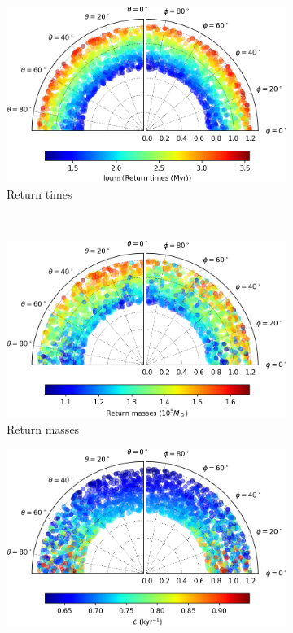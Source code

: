 \begin{figure}[h]
    \centering
    \begin{subfigure}[t]{0.4\textwidth}
        \includegraphics[width = \textwidth]{"../Files/Week 13/images/11_time"}
        \caption{Return times}
    \end{subfigure}
    ~ 
    \begin{subfigure}[t]{0.4\textwidth}
        \includegraphics[width=\textwidth]{"../Files/Week 13/images/11_mass"}
        \caption{Return masses}
    \end{subfigure}
    \begin{subfigure}[t]{0.4\textwidth}
        \includegraphics[width=\textwidth]{"../Files/Week 13/images/11_lyapunov"}

\end{subfigure}
\end{figure}
